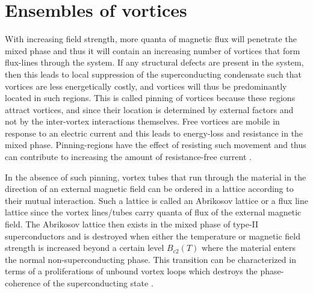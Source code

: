 \section{Ensembles of vortices}

With increasing field strength, more quanta of magnetic flux will penetrate the mixed phase and thus it will contain an increasing number of vortices that form flux-lines through the system.
If any structural defects are present in the
system, then this leads to local suppression of the superconducting condensate such that vortices are less energetically costly, and vortices will thus be predominantly located in such regions.
This is called pinning of vortices because these regions attract vortices, and since their location is determined by external factors and not by the inter-vortex interactions themselves.
Free vortices are mobile in 
response to an electric current and this leads to energy-loss and resistance in the mixed phase. Pinning-regions have the effect of resisting such movement and thus can contribute to increasing
the amount of resistance-free current \cite{Ishida19}.

In the absence of such pinning, vortex tubes that run through the material in the direction of an external magnetic field can be ordered in a lattice according to their mutual interaction.
Such a lattice is called an Abrikosov lattice or a flux line lattice since the vortex lines/tubes carry quanta of flux of the external magnetic field.
The Abrikosov lattice then exists in the mixed phase of type-II superconductors and is destroyed when either the temperature or magnetic field strength is increased beyond a certain level
$B_{c2}(T)$ where the material enters the normal non-superconducting phase. This transition can be characterized in terms of a proliferations of unbound vortex loops which destroys the
phase-coherence of the superconducting state \cite{Fossheim-Sudbo-Book}.

